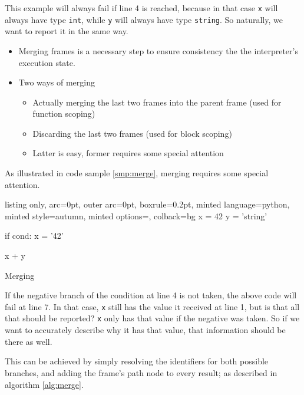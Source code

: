 \documentclass[]{article}
\providecommand{\tightlist}{%
  \setlength{\itemsep}{0pt}\setlength{\parskip}{0pt}}
\begin{document}
This example will always fail if line 4 is reached, because in that case
\texttt{x} will always have type \texttt{int}, while \texttt{y} will
always have type \texttt{string}. So naturally, we want to report it in
the same way.

\begin{itemize}
\tightlist
\item
  Merging frames is a necessary step to ensure consistency the the
  interpreter's execution state.
\item
  Two ways of merging

  \begin{itemize}
  \tightlist
  \item
    Actually merging the last two frames into the parent frame (used for
    function scoping)
  \item
    Discarding the last two frames (used for block scoping)
  \item
    Latter is easy, former requires some special attention
  \end{itemize}
\end{itemize}

As illustrated in code sample \ref{smp:merge}, merging requires some
special attention.

\begin{code}
  \begin{tcblisting}{listing only, 
  arc=0pt,
  outer arc=0pt, 
  boxrule=0.2pt,
  minted language=python,
  minted style=autumn,
  minted options={},
  colback=bg }x = 42
y = 'string'

if cond:
  x = '42'

x + y 
\end{tcblisting}
\caption{Merging}\label{smp:merge}
\end{code}

If the negative branch of the condition at line 4 is not taken, the
above code will fail at line 7. In that case, \texttt{x} still has the
value it received at line 1, but is that all that should be reported?
\texttt{x} only has that value if the negative was taken. So if we want
to accurately describe why it has that value, that information should be
there as well.

This can be achieved by simply resolving the identifiers for both
possible branches, and adding the frame's path node to every result; as
described in algorithm \ref{alg:merge}.
\end{document}
